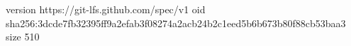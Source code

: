 version https://git-lfs.github.com/spec/v1
oid sha256:3dcde7fb32395ff9a2efab3f08274a2acb24b2c1eed5b6b673b80f88cb53baa3
size 510
